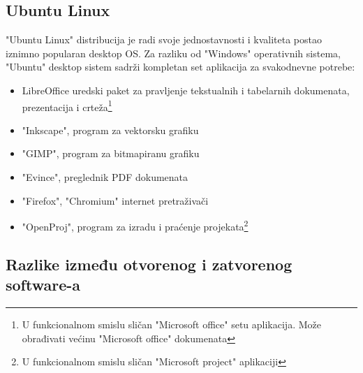 \documentclass[times, utf8, seminar]{fit}
\begin{document}
\subsection{Ubuntu Linux}
"Ubuntu Linux" distribucija je radi svoje jednostavnosti i kvaliteta postao iznimno popularan desktop OS. Za razliku od "Windows" operativnih sistema, "Ubuntu" desktop sistem sadrži kompletan set aplikacija za svakodnevne potrebe:
\begin{itemize}
  \item LibreOffice uredski paket za pravljenje tekstualnih i tabelarnih dokumenata, prezentacija i crteža\footnote{U funkcionalnom smislu sličan "Microsoft office" setu aplikacija. Može obrađivati većinu "Microsoft office" dokumenata}
  \item "Inkscape", program za vektorsku grafiku \cite{inkscape}
  \item "GIMP", program za bitmapiranu grafiku
  \item "Evince", preglednik PDF dokumenata
  \item "Firefox", "Chromium" internet pretraživači
  \item "OpenProj", program za izradu i praćenje projekata\footnote{U funkcionalnom smislu sličan "Microsoft project" aplikaciji}
\end{itemize}  

 
\subsection{Razlike između otvorenog i zatvorenog software-a} 
\end{document}

